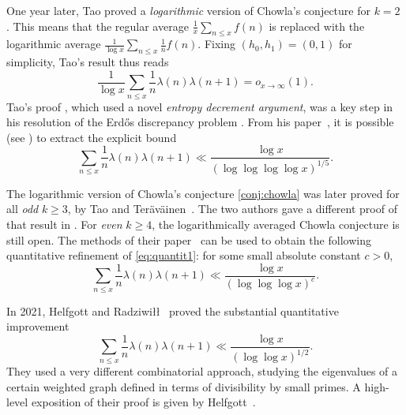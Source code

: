 \documentclass[11pt]{amsart}
\theoremstyle{definition}
\renewcommand{\leq}{\leqslant}
\renewcommand{\geq}{\geqslant}
\begin{document}
One year later, Tao proved a \emph{logarithmic} version of Chowla's conjecture for $k=2$ \cite{T}. This means that the regular average $\tfrac1x \sum_{n\leq x} f(n)$ is replaced with the logarithmic average $\frac{1}{\log x} \sum_{n\leq x}\frac 1n f(n)$. Fixing $(h_0, h_1) = (0, 1)$ for simplicity, Tao's result thus reads
\begin{equation}
\label{eq:logchowla}
\frac{1}{\log x}\sum_{n\leq x} \frac{1}{n}\lambda(n) \lambda(n+1) = o_{x\to \infty}(1).
\end{equation}
Tao's proof \cite{T}, which used a novel \emph{entropy decrement argument}, was a key step in his resolution of the Erdős discrepancy problem \cite{erdos}. From his paper~\cite{T}, it is possible (see \cite{HU}) to extract the explicit bound
\begin{equation}
\label{eq:quantit1}
\sum_{n\leq x} \frac{1}{n}\lambda(n) \lambda(n+1) \ll \frac{\log x}{(\log \log \log \log x)^{1/5}}.
\end{equation}

The logarithmic version of Chowla's conjecture \cref{conj:chowla} was later proved for all \emph{odd} $k\geq 3$, by Tao and Teräväinen~\cite{TTduke}. The two authors gave a different proof of that result in \cite{taoODD}. For \emph{even} $k\geq 4$, the logarithmically averaged Chowla conjecture is still open. The methods of their paper~\cite{taoODD} can be used to obtain the following quantitative refinement of \cref{eq:quantit1}: for some small absolute constant $c>0$,
\begin{equation}
\label{eq:quantit2}
\sum_{n\leq x} \frac{1}{n}\lambda(n) \lambda(n+1) \ll \frac{\log x}{(\log \log \log x)^{c}}.
\end{equation}

In 2021, Helfgott and Radziwi\l\l~\cite{HR} proved the substantial quantitative improvement
\begin{equation}
\label{eq:HRchowla}
\sum_{n\leq x} \frac{1}{n}\lambda(n) \lambda(n+1) \ll \frac{\log x}{(\log \log x)^{1/2}}.
\end{equation}
They used a very different combinatorial approach, studying the eigenvalues of a certain weighted graph defined in terms of divisibility by small primes. A high-level exposition of their proof is given by Helfgott~\cite{explanation}. 
\end{document}
